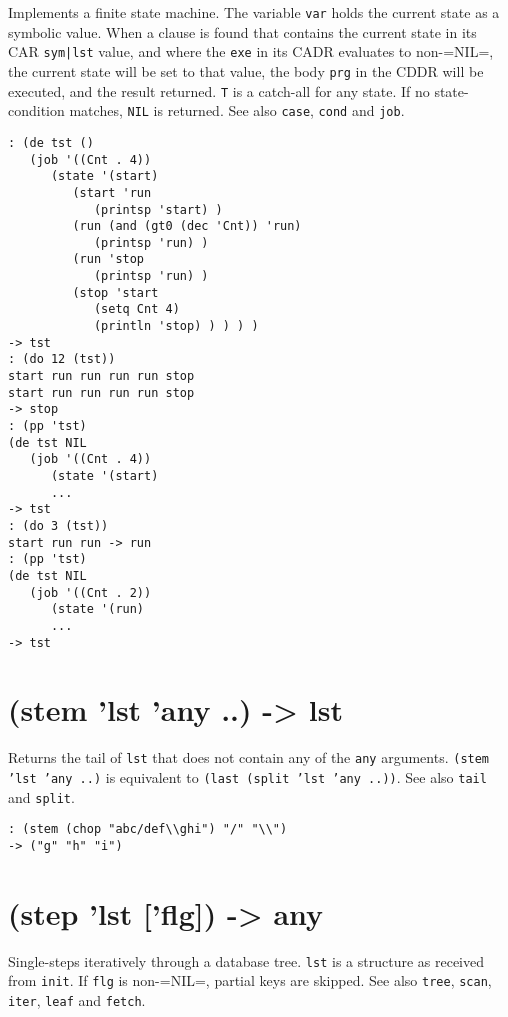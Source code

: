 {{{{{{{{Implements a finite state machine. The variable \texttt{var} holds the current
state as a symbolic value. When a clause is found that contains the
current state in its CAR \texttt{sym|lst} value, and where the \texttt{exe} in its
CADR evaluates to non-=NIL=, the current state will be set to that
value, the body \texttt{prg} in the CDDR will be executed, and the result
returned. \texttt{T} is a catch-all for any state. If no state-condition
matches, \texttt{NIL} is returned. See also \texttt{case}, \texttt{cond} and \texttt{job}.


\begin{verbatim}
: (de tst ()
   (job '((Cnt . 4))
      (state '(start)
         (start 'run
            (printsp 'start) )
         (run (and (gt0 (dec 'Cnt)) 'run)
            (printsp 'run) )
         (run 'stop
            (printsp 'run) )
         (stop 'start
            (setq Cnt 4)
            (println 'stop) ) ) ) )
-> tst
: (do 12 (tst))
start run run run run stop
start run run run run stop
-> stop
: (pp 'tst)
(de tst NIL
   (job '((Cnt . 4))
      (state '(start)
      ...
-> tst
: (do 3 (tst))
start run run -> run
: (pp 'tst)
(de tst NIL
   (job '((Cnt . 2))
      (state '(run)
      ...
-> tst
\end{verbatim}

 
\section{(stem 'lst 'any ..) -> lst}
\label{sec-8-1-19-35}


Returns the tail of \texttt{lst} that does not contain any of the \texttt{any}
arguments. \texttt{(stem 'lst 'any ..)} is equivalent to
\texttt{(last (split 'lst 'any ..))}. See also \texttt{tail} and \texttt{split}.


\begin{verbatim}
: (stem (chop "abc/def\\ghi") "/" "\\")
-> ("g" "h" "i")
\end{verbatim}

 
\section{(step 'lst ['flg]) -> any}
\label{sec-8-1-19-36}


Single-steps iteratively through a database tree. \texttt{lst} is a structure
as received from \texttt{init}. If \texttt{flg} is non-=NIL=, partial keys are
skipped. See also \texttt{tree}, \texttt{scan}, \texttt{iter}, \texttt{leaf} and \texttt{fetch}.


}}}}}}}}
